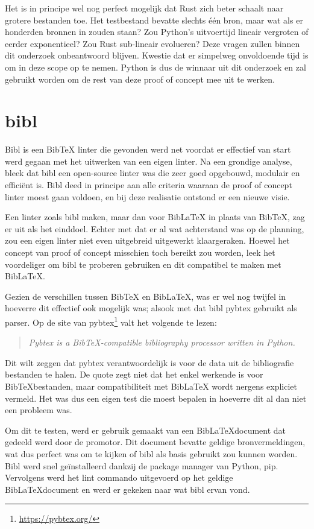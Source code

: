 Het is in principe wel nog perfect mogelijk dat Rust zich beter schaalt naar grotere bestanden toe. Het testbestand bevatte slechts één bron, maar wat als er honderden bronnen in zouden staan? Zou Python's uitvoertijd lineair vergroten of eerder exponentieel? Zou Rust sub-lineair evolueren? Deze vragen zullen binnen dit onderzoek onbeantwoord blijven. Kwestie dat er simpelweg onvoldoende tijd is om in deze scope op te nemen.\newline
Python is dus de winnaar uit dit onderzoek en zal gebruikt worden om de rest van deze proof of concept mee uit te werken.

\section{bibl}
Bibl is een BibTeX linter die gevonden werd net voordat er effectief van start werd gegaan met het uitwerken van een eigen linter. Na een grondige analyse, bleek dat bibl een open-source linter was die zeer goed opgebouwd, modulair en efficiënt is. Bibl deed in principe aan alle criteria waaraan de proof of concept linter moest gaan voldoen, en bij deze realisatie ontstond er een nieuwe visie.

Een linter zoals bibl maken, maar dan voor BibLaTeX in plaats van BibTeX, zag er uit als het einddoel. Echter met dat er al wat achterstand was op de planning, zou een eigen linter niet even uitgebreid uitgewerkt klaargeraken. Hoewel het concept van proof of concept misschien toch bereikt zou worden, leek het voordeliger om bibl te proberen gebruiken en dit compatibel te maken met BibLaTeX.

Gezien de verschillen tussen BibTeX en BibLaTeX, was er wel nog twijfel in hoeverre dit effectief ook mogelijk was; alsook met dat bibl pybtex gebruikt als parser. Op de site van pybtex\footnote{\url{https://pybtex.org/}} valt het volgende te lezen: 

\begin{quote}\emph{Pybtex is a BibTeX-compatible bibliography processor written in Python.}\end{quote} 

Dit wilt zeggen dat pybtex verantwoordelijk is voor de data uit de bibliografie bestanden te halen. De quote zegt niet dat het enkel werkende is voor BibTeXbestanden, maar compatibiliteit met BibLaTeX wordt nergens expliciet vermeld. Het was dus een eigen test die moest bepalen in hoeverre dit al dan niet een probleem was.

Om dit te testen, werd er gebruik gemaakt van een BibLaTeXdocument dat gedeeld werd door de promotor. Dit document bevatte geldige bronvermeldingen, wat dus perfect was om te kijken of bibl als basis gebruikt zou kunnen worden. Bibl werd snel geïnstalleerd dankzij de package manager van Python, pip. Vervolgens werd het lint commando uitgevoerd op het geldige BibLaTeXdocument en werd er gekeken naar wat bibl ervan vond. 

